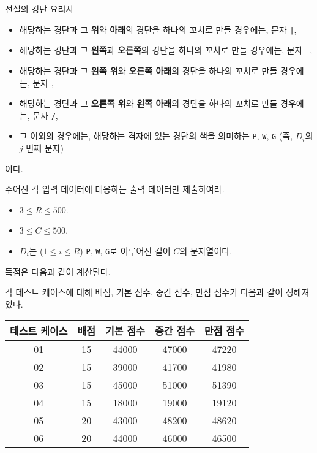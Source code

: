 \begin{problem}{전설의 경단 요리사}
\begin{itemize}
	\item 해당하는 경단과 그 \textbf{위}와 \textbf{아래}의 경단을 하나의 꼬치로 만들 경우에는, 문자 \texttt{|},
	
	\item 해당하는 경단과 그 \textbf{왼쪽}과 \textbf{오른쪽}의 경단을 하나의 꼬치로 만들 경우에는, 문자 \texttt{-},
	
	\item 해당하는 경단과 그 \textbf{왼쪽 위}와 \textbf{오른쪽 아래}의 경단을 하나의 꼬치로 만들 경우에는, 문자 \texttt{},
	
	\item 해당하는 경단과 그 \textbf{오른쪽 위}와 \textbf{왼쪽 아래}의 경단을 하나의 꼬치로 만들 경우에는, 문자 \texttt{/},
	
	\item 그 이외의 경우에는, 해당하는 격자에 있는 경단의 색을 의미하는 \texttt{P}, \texttt{W}, \texttt{G} (즉, $D_i$의 $j$ 번째 문자)
	
\end{itemize}

이다.

주어진 각 입력 데이터에 대응하는 출력 데이터만 제출하여라.



\Constraints

\begin{itemize}
	\item $3 \le R \le 500$.
	\item $3 \le C \le 500$.
	\item $D_i$는 ($1 \le i \le R$) \texttt{P}, \texttt{W}, \texttt{G}로 이루어진 길이 $C$의 문자열이다.
\end{itemize}

\Scoring

득점은 다음과 같이 계산된다.

각 테스트 케이스에 대해 배점, 기본 점수, 중간 점수, 만점 점수가 다음과 같이 정해져 있다.

\begin{tabular}{|c|c|c|c|c|}
	\hline
	테스트 케이스 & 배점 & 기본 점수 & 중간 점수 & 만점 점수 \\ \hline
	01      & 15 & 44000 & 47000 & 47220 \\
	02      & 15 & 39000 & 41700 & 41980 \\
	03      & 15 & 45000 & 51000 & 51390 \\
	04      & 15 & 18000 & 19000 & 19120 \\
	05      & 20 & 43000 & 48200 & 48620 \\
	06      & 20 & 44000 & 46000 & 46500 \\ \hline
\end{tabular}


\end{problem}

